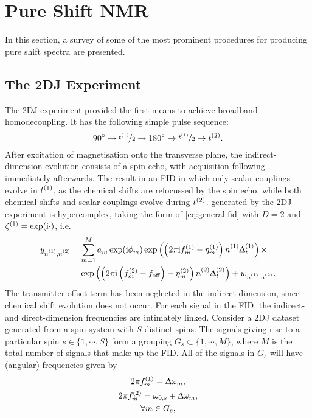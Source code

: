 \section{Pure Shift \acs{NMR}}
In this section, a survey of some of the most prominent procedures for
producing pure shift spectra are presented.
\subsection{The \acs{2DJ} Experiment}
The \ac{2DJ} experiment\cite{Aue1976, Morris2009} provided the first means to
achieve broadband homodecoupling. It has the following simple pulse sequence:
\[
    \ang{90} \rightarrow \nicefrac{t^{(1)}}{2} \rightarrow \ang{180} \rightarrow \nicefrac{t^{(1)}}{2} \rightarrow t^{(2)}.
\]
After excitation of magnetisation onto the transverse plane, the
indirect-dimension evolution consists of a spin echo, with acquisition
following
immediately afterwards. The result in an \ac{FID} in which only scalar
couplings evolve in $t^{(1)}$, as the chemical shifts are refocussed by the
spin echo, while both chemical shifts and scalar
couplings evolve during $t^{(2)}$.  generated by the \ac{2DJ}
experiment is hypercomplex, taking the form of \cref{eq:general-fid} with
$D=2$ and $\zeta^{(1)} = \exp(\mathrm{i}\cdot)$, i.e.
\begin{equation}%
    \begin{split}%
        y_{\none,\ntwo} =
        &\sum_{m=1}^{M} a_m \exp(\iu \phi_m)
            \exp\left(\left(2 \pi \iu \fonem - \etaonem\right) \none \Dtone\right) \times \\
        &\exp\left(\left(2 \pi \iu  \left(\ftwom - \foff\right)
            - \etatwom\right) \ntwo \Dttwo\right)
            + w_{\none,\ntwo}.
    \end{split}%
    \label{eq:jres-fid}%
\end{equation}%
The transmitter offset term has been neglected in the indirect dimension, since
chemical shift evolution does not occur.
For each signal in the \ac{FID}, the indirect- and direct-dimension
frequencies are intimately linked. Consider a \ac{2DJ} dataset generated from a
spin system with $S$ distinct spins. The signals giving rise to a particular
spin $s \in \lbrace 1, \cdots, S \rbrace$ form a grouping $G_s
\subset \lbrace 1, \cdots, M \rbrace$, where $M$ is the total number of signals
that make up the \ac{FID}. All of the signals in $G_s$ will have (angular)
frequencies given by
\begin{subequations}
    \begin{gather}
        2 \pi f_m^{(1)} = \Updelta \omega_m,\\
        2 \pi f_m^{(2)} = \omega_{0,s} + \Updelta \omega_m,\\
        \forall m \in G_s\notag,
    \end{gather}%
    \label{eq:f1-f2-2dj}%
\end{subequations}
